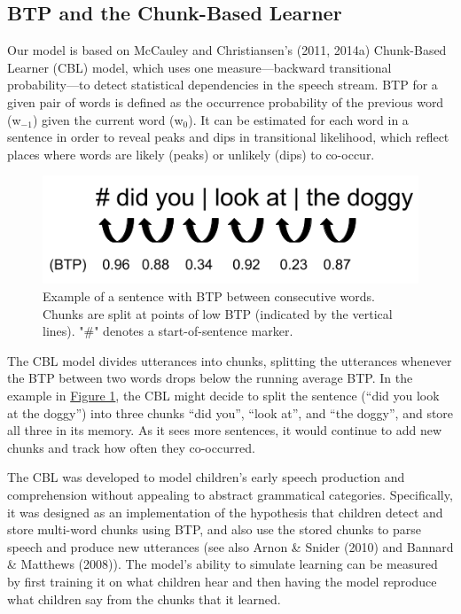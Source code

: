\documentclass[man,mask,floatsintext]{apa6}
\theoremstyle{definition}
\theoremstyle{definition}
\theoremstyle{definition}
\theoremstyle{remark}
\begin{document}
\subsection{BTP and the Chunk-Based
Learner}\label{btp-and-the-chunk-based-learner}

Our model is based on McCauley and Christiansen's (2011, 2014a)
Chunk-Based Learner (CBL) model, which uses one measure---backward
transitional probability---to detect statistical dependencies in the
speech stream. BTP for a given pair of words is defined as the
occurrence probability of the previous word (w\(_{-1}\)) given the
current word (w\(_0\)). It can be estimated for each word in a sentence
in order to reveal peaks and dips in transitional likelihood, which
reflect places where words are likely (peaks) or unlikely (dips) to
co-occur.

\begin{figure}

{\centering \includegraphics[width=0.95\linewidth]{images/chunking_mechanism} 

}

\caption{Example of a sentence with BTP between consecutive words. Chunks are split at points of low BTP (indicated by the vertical lines). "\#" denotes a start-of-sentence marker.}\label{fig:fig1}
\end{figure}

The CBL model divides utterances into chunks, splitting the utterances
whenever the BTP between two words drops below the running average BTP.
In the example in \protect\hyperlink{fig1}{Figure 1}, the CBL might
decide to split the sentence (\enquote{did you look at the doggy}) into
three chunks \enquote{did you}, \enquote{look at}, and \enquote{the
doggy}, and store all three in its memory. As it sees more sentences, it
would continue to add new chunks and track how often they co-occurred.

The CBL was developed to model children's early speech production and
comprehension without appealing to abstract grammatical categories.
Specifically, it was designed as an implementation of the hypothesis
that children detect and store multi-word chunks using BTP, and also use
the stored chunks to parse speech and produce new utterances (see also
Arnon \& Snider (2010) and Bannard \& Matthews (2008)). The model's
ability to simulate learning can be measured by first training it on
what children hear and then having the model reproduce what children say
from the chunks that it learned.
\end{document}
